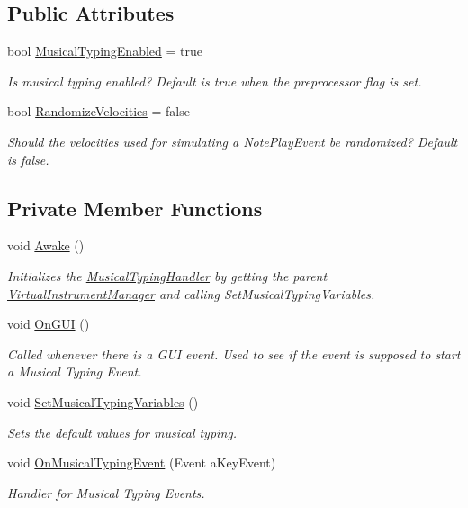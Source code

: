 \subsection*{Public Attributes}
\begin{DoxyCompactItemize}
\item 
bool \hyperlink{group___mus_typ_pub_var_ga09a764161d537b31fac1a64ee5d39625}{Musical\+Typing\+Enabled} = true
\begin{DoxyCompactList}\small\item\em Is musical typing enabled? Default is true when the preprocessor flag is set. \end{DoxyCompactList}\item 
bool \hyperlink{group___mus_typ_pub_var_gad09f6f673034d9cd95f699838c9518d5}{Randomize\+Velocities} = false
\begin{DoxyCompactList}\small\item\em Should the velocities used for simulating a Note\+Play\+Event be randomized? Default is false. \end{DoxyCompactList}\end{DoxyCompactItemize}
\subsection*{Private Member Functions}
\begin{DoxyCompactItemize}
\item 
void \hyperlink{group___mus_typ_unity_ga2935e4d4209f57f19ea242968c861f3f}{Awake} ()
\begin{DoxyCompactList}\small\item\em Initializes the \hyperlink{class_musical_typing_handler}{Musical\+Typing\+Handler} by getting the parent \hyperlink{class_virtual_instrument_manager}{Virtual\+Instrument\+Manager} and calling Set\+Musical\+Typing\+Variables. \end{DoxyCompactList}\item 
void \hyperlink{group___mus_typ_unity_ga13a20522cf119917cb41e21051122977}{On\+G\+UI} ()
\begin{DoxyCompactList}\small\item\em Called whenever there is a G\+UI event. Used to see if the event is supposed to start a Musical Typing Event. \end{DoxyCompactList}\item 
void \hyperlink{group___mus_typ_priv_func_ga5db8ab750574dbc31279827ea5cc501e}{Set\+Musical\+Typing\+Variables} ()
\begin{DoxyCompactList}\small\item\em Sets the default values for musical typing. \end{DoxyCompactList}\item 
void \hyperlink{group___mus_typ_handlers_ga391a3d207136b7eb0e734e289b520188}{On\+Musical\+Typing\+Event} (Event a\+Key\+Event)
\begin{DoxyCompactList}\small\item\em Handler for Musical Typing Events. \end{DoxyCompactList}\end{DoxyCompactItemize}
